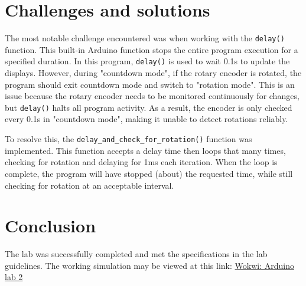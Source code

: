 \documentclass[fleqn]{article}
\begin{document}
\section*{Challenges and solutions}
The most notable challenge encountered was when working with the \verb|delay()| function. This built-in Arduino function stops the entire program execution for a specified duration. In this program, \verb|delay()| is used to wait 0.1s to update the displays. However, during "countdown mode", if the rotary encoder is rotated, the program should exit countdown mode and switch to "rotation mode". This is an issue because the rotary encoder needs to be monitored continuously for changes, but \verb|delay()| halts all program activity. As a result, the encoder is only checked every 0.1s in "countdown mode", making it unable to detect rotations reliably. 

\vspace{0.15cm}
To resolve this, the \verb|delay_and_check_for_rotation()| function was implemented. This function accepts a delay time then loops that many times, checking for rotation and delaying for 1ms each iteration. When the loop is complete, the program will have stopped (about) the requested time, while still checking for rotation at an acceptable interval.

\section*{Conclusion}
The lab was successfully completed and met the specifications in the lab guidelines. The working simulation may be viewed at this link: \href{https://wokwi.com/projects/416744232255463425}{Wokwi: Arduino lab 2}
\end{document}
